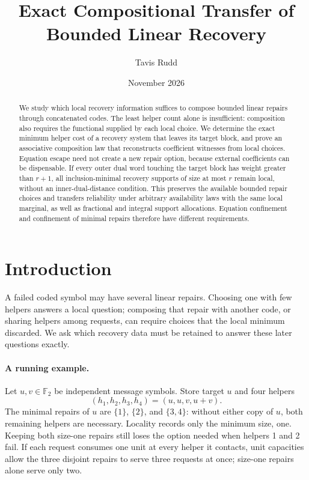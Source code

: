 \documentclass[11pt]{article}
\title{Exact Compositional Transfer of Bounded Linear Recovery}
\author{Tavis Rudd}
\date{November 2026}
\theoremstyle{definition}
\newcommand{\F}{\mathbb F}
\begin{document}
\maketitle

\begin{abstract}
We study which local recovery information suffices to compose bounded linear
repairs through concatenated codes.  The least helper count alone is insufficient:
composition also requires the functional supplied by each local choice.  We
determine the exact minimum helper cost of a recovery system that leaves its
target block, and prove an associative composition law that reconstructs
coefficient witnesses from local choices.  Equation escape need not create a
new repair option, because external coefficients can be dispensable.  If every
outer dual word touching the target block has weight greater than $r+1$, all
inclusion-minimal recovery supports of size at most $r$ remain local, without
an inner-dual-distance condition.  This preserves the available bounded repair
choices and transfers reliability under arbitrary availability laws with the
same local marginal, as well as fractional and integral support allocations.
Equation confinement and confinement of minimal repairs therefore have different
requirements.
\end{abstract}

\section{Introduction}

A failed coded symbol may have several linear repairs.  Choosing one with
few helpers answers a local question; composing that repair with another
code, or sharing helpers among requests, can require choices that the local
minimum discarded.  We ask which recovery data must be retained to answer
these later questions exactly.

\paragraph{A running example.}
\label{ex:running-recovery}
Let $u,v\in\F_2$ be independent message symbols.  Store target $u$ and four
helpers
\[
 (h_1,h_2,h_3,h_4)=(u,u,v,u+v).
\]
The minimal repairs of $u$ are $\{1\}$, $\{2\}$, and $\{3,4\}$: without
either copy of $u$, both remaining helpers are necessary.  Locality records
only the minimum size, one.  Keeping both size-one repairs still loses the
option needed when helpers 1 and 2 fail.  If each request consumes one unit at every helper it contacts, unit
capacities allow the three disjoint repairs to serve three requests at once;
size-one repairs alone serve only two.
\end{document}
